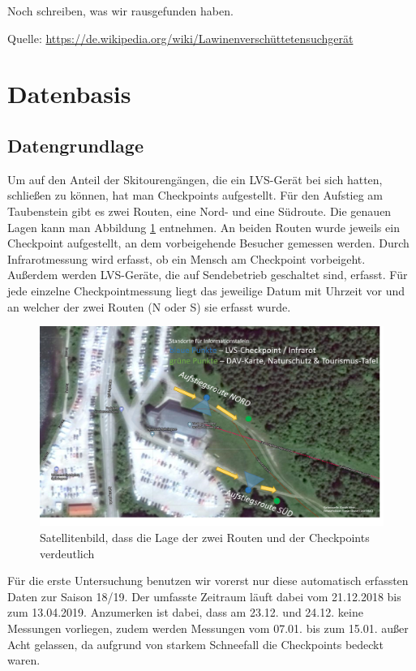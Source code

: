 \documentclass[12pt]{article}
\begin{document}
	Noch schreiben, was wir rausgefunden haben.
	
	Quelle:
	\url{https://de.wikipedia.org/wiki/Lawinenverschüttetensuchgerät}
	
	\section{Datenbasis}
	\subsection{Datengrundlage}
	Um auf den Anteil der Skitourengängen, die ein LVS-Gerät bei sich hatten, schließen zu können, hat man Checkpoints aufgestellt. Für den Aufstieg am Taubenstein gibt es zwei Routen, eine Nord- und eine Südroute. Die genauen Lagen kann man Abbildung \ref{pic:checkpoints} entnehmen. An beiden Routen wurde jeweils ein Checkpoint aufgestellt, an dem vorbeigehende Besucher gemessen werden. Durch Infrarotmessung wird erfasst, ob ein Mensch am Checkpoint vorbeigeht. Außerdem werden LVS-Geräte, die auf Sendebetrieb geschaltet sind, erfasst. Für jede einzelne Checkpointmessung liegt das jeweilige Datum mit Uhrzeit vor und an welcher der zwei Routen (N oder S) sie erfasst wurde.
	
	\begin{figure}[H]
		\centering
		\includegraphics[width=.9\textwidth]{bilder/checkpoints}
		\caption{Satellitenbild, dass die Lage der zwei Routen und der Checkpoints verdeutlich}
		\label{pic:checkpoints}
	\end{figure}
	
	\noindent Für die erste Untersuchung benutzen wir vorerst nur diese automatisch erfassten Daten zur Saison 18/19. Der umfasste Zeitraum läuft dabei vom 21.12.2018 bis zum 13.04.2019. Anzumerken ist dabei, dass am 23.12. und 24.12. keine Messungen vorliegen, zudem werden Messungen vom 07.01. bis zum 15.01. außer Acht gelassen, da aufgrund von starkem Schneefall die Checkpoints bedeckt waren.
	
\end{document}
